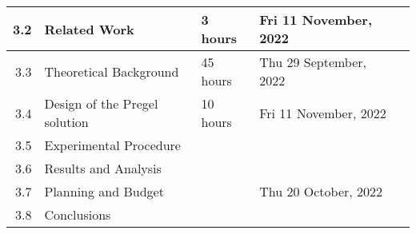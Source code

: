 \documentclass{standalone}
\begin{document}
\begin{tabular}{|r|llll|}
    3.2                                                           & \multicolumn{1}{l|}{Related Work}                               & \multicolumn{1}{l|}{3 hours}                                   & \multicolumn{1}{l|}{Fri 11 November, 2022}                  &                                                              \\ \hline
    3.3                                                           & \multicolumn{1}{l|}{Theoretical Background}                     & \multicolumn{1}{l|}{45 hours}                                  & \multicolumn{1}{l|}{Thu 29 September, 2022}                 &                                                              \\ \hline
    3.4                                                           & \multicolumn{1}{l|}{Design of the Pregel solution}              & \multicolumn{1}{l|}{10 hours}                                  & \multicolumn{1}{l|}{Fri 11 November, 2022}                  &                                                              \\ \hline
    3.5                                                           & \multicolumn{1}{l|}{Experimental Procedure}                     & \multicolumn{1}{l|}{}                                          & \multicolumn{1}{l|}{}                                       &                                                              \\ \hline
    3.6                                                           & \multicolumn{1}{l|}{Results and Analysis}                       & \multicolumn{1}{l|}{}                                          & \multicolumn{1}{l|}{}                                       &                                                              \\ \hline
    3.7                                                           & \multicolumn{1}{l|}{Planning and Budget}                        & \multicolumn{1}{l|}{}                                          & \multicolumn{1}{l|}{Thu 20 October, 2022}                   &                                                              \\ \hline
    3.8                                                           & \multicolumn{1}{l|}{Conclusions}                                & \multicolumn{1}{l|}{}                                          & \multicolumn{1}{l|}{}                                       &                                                              \\ \hline

\end{tabular}
\end{document}
